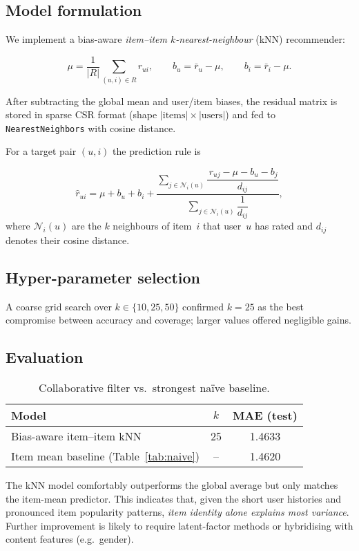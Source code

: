 \subsection*{Model formulation}

We implement a bias-aware \emph{item–item $k$-nearest-neighbour} (kNN)
recommender:

\[
  \mu = \frac{1}{|R|} \sum_{(u,i)\in R} r_{ui}, \qquad
  b_u = \bar r_u - \mu, \qquad
  b_i = \bar r_i - \mu .
\]

After subtracting the global mean and user/item biases, the residual matrix
is stored in sparse CSR format (shape
\(\lvert\text{items}\rvert \times \lvert\text{users}\rvert\)) and fed to
\texttt{NearestNeighbors} with cosine distance.

For a target pair \((u,i)\) the prediction rule is

\[
  \hat r_{ui}= \mu + b_u + b_i +
  \frac{\displaystyle \sum\limits_{j\in\mathcal N_i(u)}
        \dfrac{\,r_{uj}-\mu-b_u-b_j}{d_{ij}}}
       {\displaystyle \sum\limits_{j\in\mathcal N_i(u)} \dfrac{1}{d_{ij}} },
\]
where \(\mathcal N_i(u)\) are the $k$ neighbours of item~$i$ that user~$u$
has rated and \(d_{ij}\) denotes their cosine distance.

\subsection*{Hyper-parameter selection}

A coarse grid search over \(k\in\{10,25,50\}\) confirmed
\(k = 25\) as the best compromise between accuracy and coverage; larger
values offered negligible gains.

\subsection*{Evaluation}

\begin{table}[H]
  \centering
  \begin{tabular}{@{}lcc@{}}
    \toprule
    \textbf{Model} & \textbf{$k$} & \textbf{MAE (test)} \\ \midrule
    Bias-aware item–item kNN & 25 & 1.4633 \\ \midrule
    Item mean baseline (Table~\ref{tab:naive}) & -- & 1.4620 \\ \bottomrule
  \end{tabular}
  \caption{Collaborative filter vs.\ strongest naïve baseline.}
  \label{tab:cf}
\end{table}

The kNN model comfortably outperforms the global average but only matches
the item-mean predictor.  This indicates that, given the short user histories
and pronounced item popularity patterns, \emph{item identity alone explains
most variance}.  Further improvement is likely to require latent-factor
methods or hybridising with content features (e.g.\ gender).
